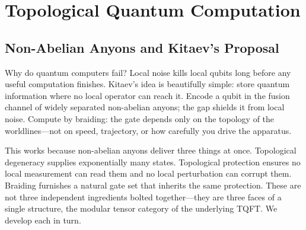 %
%
%
%
%
%
%
%

\section{Topological Quantum Computation}
\label{sec:tqc}

\subsection{Non-Abelian Anyons and Kitaev's Proposal}
\label{subsec:kitaev-proposal}

Why do quantum computers fail?  Local noise kills local qubits long before any useful computation finishes.  Kitaev's idea \cite{Kitaev2003FaultTolerant} is beautifully simple: store quantum information where no local operator can reach it.  Encode a qubit in the fusion channel of widely separated non-abelian anyons; the gap shields it from local noise.  Compute by braiding: the gate depends only on the topology of the worldlines---not on speed, trajectory, or how carefully you drive the apparatus.

This works because non-abelian anyons deliver three things at once.  Topological degeneracy supplies exponentially many states.  Topological protection ensures no local measurement can read them and no local perturbation can corrupt them.  Braiding furnishes a natural gate set that inherits the same protection.  These are not three independent ingredients bolted together---they are three faces of a single structure, the modular tensor category of the underlying TQFT.  We develop each in turn.

